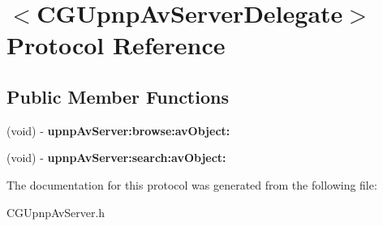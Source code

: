 \hypertarget{protocol_c_g_upnp_av_server_delegate-p}{\section{$<$C\-G\-Upnp\-Av\-Server\-Delegate$>$ Protocol Reference}
\label{protocol_c_g_upnp_av_server_delegate-p}
}
\subsection*{Public Member Functions}
\begin{DoxyCompactItemize}
\item 
\hypertarget{protocol_c_g_upnp_av_server_delegate-p_a55594d2e3ce31d8d9539fc3e20ba6c27}{(void) -\/ {\bfseries upnp\-Av\-Server\-:browse\-:av\-Object\-:}}\label{protocol_c_g_upnp_av_server_delegate-p_a55594d2e3ce31d8d9539fc3e20ba6c27}

\item 
\hypertarget{protocol_c_g_upnp_av_server_delegate-p_a349bee48cc928f14e53427ea23354f7e}{(void) -\/ {\bfseries upnp\-Av\-Server\-:search\-:av\-Object\-:}}\label{protocol_c_g_upnp_av_server_delegate-p_a349bee48cc928f14e53427ea23354f7e}

\end{DoxyCompactItemize}


The documentation for this protocol was generated from the following file\-:\begin{DoxyCompactItemize}
\item 
C\-G\-Upnp\-Av\-Server.\-h\end{DoxyCompactItemize}
